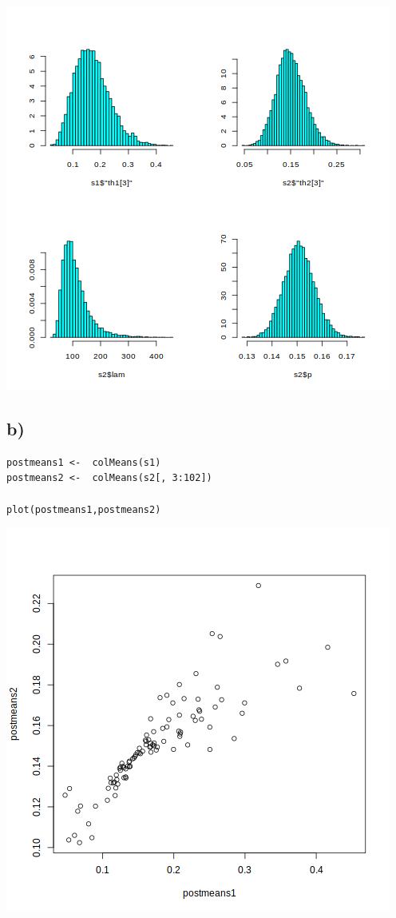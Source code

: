 \documentclass[11pt]{article}
\begin{document}
\begin{center}
\includegraphics[width=.9\linewidth]{fig1.png}
\end{center}

\subsection*{b)}
\label{sec:org5bd09a6}
\begin{verbatim}
postmeans1 <-  colMeans(s1)
postmeans2 <-  colMeans(s2[, 3:102])

plot(postmeans1,postmeans2)
\end{verbatim}

\begin{center}
\includegraphics[width=.9\linewidth]{fig2.png}
\end{center}
\end{document}
